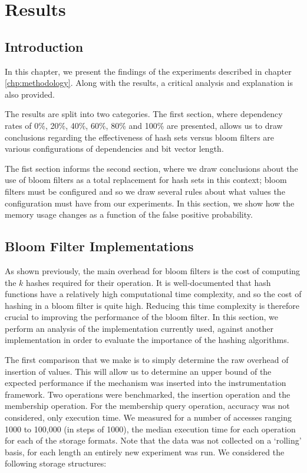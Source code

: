 \chapter{Results} \label{chp:results}
\section{Introduction} \label{sec:results/introduction}
In this chapter, we present the findings of the experiments described in chapter \ref{chp:methodology}. Along with the results, a critical analysis and explanation is also provided.

The results are split into two categories. The first section, where dependency rates of 0\%, 20\%, 40\%, 60\%, 80\% and 100\% are presented, allows us to draw conclusions regarding the effectiveness of hash sets versus bloom filters are various configurations of dependencies and bit vector length.

The fist section informs the second section, where we draw conclusions about the use of bloom filters as a total replacement for hash sets in this context; bloom filters must be configured and so we draw several rules about what values the configuration must have from our experiments. In this section, we show how the memory usage changes as a function of the false positive probability.

\section{Bloom Filter Implementations} \label{sec:results/bfimpl}
As shown previously, the main overhead for bloom filters is the cost of computing the $k$ hashes required for their operation. It is well-documented that hash functions have a relatively high computational time complexity, and so the cost of hashing in a bloom filter is quite high. Reducing this time complexity is therefore crucial to improving the performance of the bloom filter. In this section, we perform an analysis of the implementation currently used, against another implementation in order to evaluate the importance of the hashing algorithms.

The first comparison that we make is to simply determine the raw overhead of insertion of values. This will allow us to determine an upper bound of the expected performance if the mechanism was inserted into the instrumentation framework. Two operations were benchmarked, the insertion operation and the membership operation. For the membership query operation, accuracy was not considered, only execution time. We measured for a number of accesses ranging 1000 to 100,000 (in steps of 1000), the median execution time for each operation for each of the storage formats. Note that the data was not collected on a `rolling' basis, for each length an entirely new experiment was run. We considered the following storage structures:

